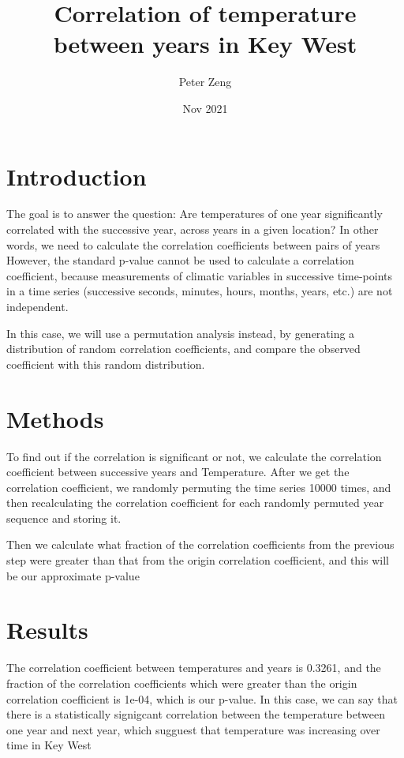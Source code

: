 \documentclass[8pt]{article}
\title{Correlation of temperature between years in Key West}
\author{Peter Zeng}
\date{Nov 2021}
\begin{document}
    \maketitle

    \section{Introduction}
        The goal is to answer the question: Are temperatures of one year significantly correlated with the successive year, across years in a given location? 
        In other words, we need to calculate the correlation coefficients between pairs of years
        However, the standard p-value cannot be used to calculate a correlation coefficient, because
        measurements of climatic variables in successive time-points in a time series (successive seconds, minutes, hours, months, years, etc.)
        are not independent. 
        
        In this case, we will use a permutation analysis instead, by generating a distribution of random correlation coefficients, 
        and compare the observed coefficient with this random distribution.
    
    \section{Methods}
        To find out if the correlation is significant or not, we calculate the correlation coefficient between successive years and Temperature. 
        After we get the correlation coefficient, we randomly permuting the time series 10000 times, and then recalculating the correlation
        coefficient for each randomly permuted year sequence and storing it. 

        Then we calculate what fraction of the correlation coefficients from the previous step were greater than that from the origin correlation 
        coefficient, and this will be our approximate p-value


    \section{Results}
        The correlation coefficient between temperatures and years is 0.3261, and the fraction of the correlation coefficients which   
        were greater than the origin correlation coefficient is 1e-04, which is our p-value. In this case, we can say that there is a statistically signigcant correlation 
        between the temperature between one year and next year, which sugguest that temperature was increasing over time in Key West
\end{document}

